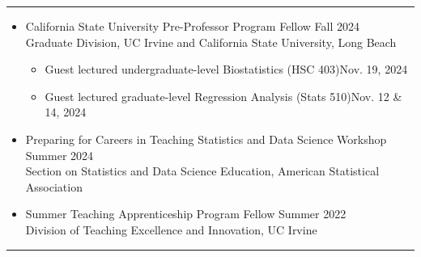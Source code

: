 \documentclass{article}
\begin{document}
	\vspace{-2mm}
	\rule{\linewidth}{1pt}
	
	
	
	
	\begin{description}
		\vspace{-2mm}
		\item[Teaching Preparation]\hspace*{.1in}
		
		\begin{itemize}
			\item California State University Pre-Professor Program Fellow \hfill{Fall 2024}\\
			Graduate Division, UC Irvine and California State University, Long Beach
			\begin{itemize}
				\item Guest lectured undergraduate-level Biostatistics (HSC 403)\hfill{Nov. 19, 2024}
				\item Guest lectured graduate-level Regression Analysis (Stats 510)\hfill{Nov. 12 \& 14, 2024}
			\end{itemize}
			
			
			\item Preparing for Careers in Teaching Statistics and Data Science Workshop \hfill{Summer 2024}\\
			Section on Statistics and Data Science Education, American Statistical Association 
			
			\item Summer Teaching Apprenticeship Program Fellow \hfill{Summer 2022}\\
			Division of Teaching Excellence and Innovation, UC Irvine
			
		\end{itemize}
	\end{description}
	\vspace{-2mm}
	\rule{\linewidth}{1pt}
	
	
\end{document}
